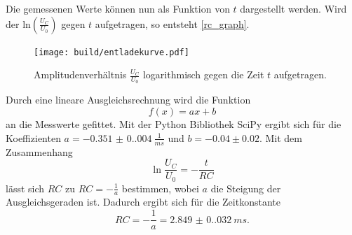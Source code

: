 Die gemessenen Werte können nun als Funktion von $t$ dargestellt werden. Wird der ln$(\frac{U_C}{U_0})$ gegen $t$ aufgetragen, so entsteht \autoref{rc_graph}.
\begin{figure}[H]
    \texttt{[image: build/entladekurve.pdf]}
    \caption{Amplitudenverhältnis $\frac{U_C}{U_0}$ logarithmisch gegen die Zeit $t$ aufgetragen.}
    \label{rc_graph}
\end{figure} 
Durch eine lineare Ausgleichsrechnung wird die Funktion
\begin{equation*}
    f(x) = ax + b
\end{equation*}
an die Messwerte gefittet. Mit der Python Bibliothek SciPy \cite{scipy} ergibt sich für die Koeffizienten $a = \SI{-0.351(0.004)}{\frac{1}{ms}}$ und $b = -0.04 \pm 0.02$.
Mit dem Zusammenhang 
\begin{equation*}
    \ln{\frac{U_C}{U_0}} = - \frac{t}{RC}
\end{equation*}
lässt sich $RC$ zu $RC = -\frac{1}{a}$ bestimmen, wobei $a$ die Steigung der Ausgleichsgeraden ist. Dadurch ergibt sich für die Zeitkonstante
\begin{equation*}
    RC = -\frac{1}{a} = \SI{2.849(0.032)}{ms}.
\end{equation*}

